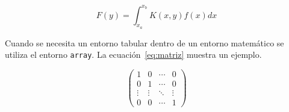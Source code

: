 \begin{equation}
F(y) =  \int_{x_a}^{x_b} K(x,y) f(x) dx
\label{eq:transformacion}
\end{equation}

Cuando se necesita un entorno tabular dentro de un entorno matemático se utiliza el entorno \texttt{array}. La ecuación~\ref{eq:matriz} muestra un ejemplo.

\begin{equation}
\left(
\begin{array}{cccc}
1 & 0 & \cdots & 0 \\
0 & 1 & \cdots & 0 \\
\vdots & \vdots & \ddots & \vdots \\
0 & 0 & \cdots & 1
\end{array}
\right)
\label{eq:matriz}
\end{equation}
